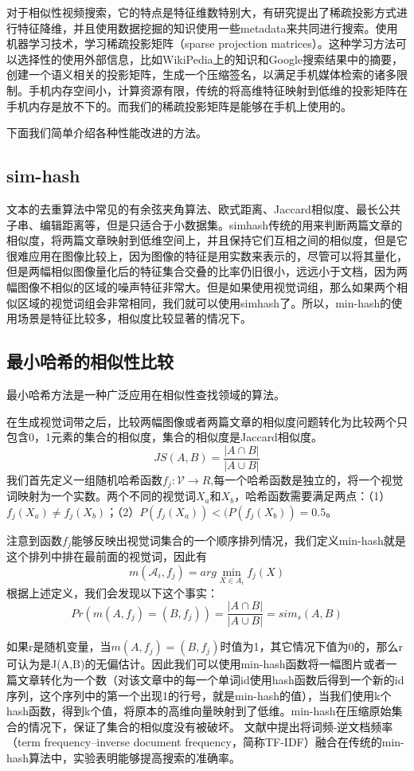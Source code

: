对于相似性视频搜索，它的特点是特征维数特别大，有研究提出了稀疏投影方式进行特征降维，并且使用数据挖掘的知识使用一些metadata来共同进行搜索\cite{Wu:2013tb}。使用机器学习技术，学习稀疏投影矩阵（sparse projection matrices）。这种学习方法可以选择性的使用外部信息，比如WikiPedia上的知识和Google搜索结果中的摘要，创建一个语义相关的投影矩阵，生成一个压缩签名，以满足手机媒体检索的诸多限制。手机内存空间小，计算资源有限，传统的将高维特征映射到低维的投影矩阵在手机内存是放不下的。而我们的稀疏投影矩阵是能够在手机上使用的。

下面我们简单介绍各种性能改进的方法。

\subsection{sim-hash}
文本的去重算法中常见的有余弦夹角算法、欧式距离、Jaccard相似度、最长公共子串、编辑距离等，但是只适合于小数据集。simhash传统的用来判断两篇文章的相似度，将两篇文章映射到低维空间上，并且保持它们互相之间的相似度，但是它很难应用在图像比较上，因为图像的特征是用实数来表示的，尽管可以将其量化，但是两幅相似图像量化后的特征集合交叠的比率仍旧很小，远远小于文档，因为两幅图像不相似的区域的噪声特征非常大。但是如果使用视觉词组，那么如果两个相似区域的视觉词组会非常相同，我们就可以使用simhash了。所以，min-hash的使用场景是特征比较多，相似度比较显著的情况下。

\subsection{最小哈希的相似性比较}
最小哈希方法是一种广泛应用在相似性查找领域的算法。

在生成视觉词带之后，比较两幅图像或者两篇文章的相似度问题转化为比较两个只包含0，1元素的集合的相似度，集合的相似度是Jaccard相似度。
\[JS(A,B)=\frac{|A\cap{B}|}{|A\cup{B}|}\]
我们首先定义一组随机哈希函数\(f_j:\mathcal{V} \to R\),每一个哈希函数是独立的，将一个视觉词映射为一个实数。两个不同的视觉词\(X_a\)和\(X_b\)，哈希函数需要满足两点：（1）\(f_j(X_a)\neq f_j(X_b)\)；（2）\(P(f_j(X_a)) < (P(f_j(X_b)) = 0.5\)。

注意到函数\(f_j\)能够反映出视觉词集合的一个顺序排列情况，我们定义min-hash就是这个排列中排在最前面的视觉词，因此有
\[m(\mathcal{A}_i,f_j)= arg\mathop {\min }\limits_{X \in A_i}f_j(X)\]
根据上述定义，我们会发现以下这个事实：
\[Pr(m(A,f_j) = (B,f_j)) = \frac{|A\cap{B}|}{|A\cup{B}|} = sim_s(A,B)\]

如果r是随机变量，当\(m(A,f_j) = (B,f_j)\)时值为1，其它情况下值为0的，那么r可认为是J(A,B)的无偏估计。因此我们可以使用min-hash函数将一幅图片或者一篇文章转化为一个数（对该文章中的每一个单词id使用hash函数后得到一个新的id序列，这个序列中的第一个出现1的行号，就是min-hash的值），当我们使用k个hash函数，得到k个值，将原本的高维向量映射到了低维。min-hash在压缩原始集合的情况下，保证了集合的相似度没有被破坏。
文献\cite{Chum:2008jo}中提出将词频-逆文档频率（term frequency–inverse document frequency，简称TF-IDF）融合在传统的min-hash算法中，实验表明能够提高搜索的准确率。

